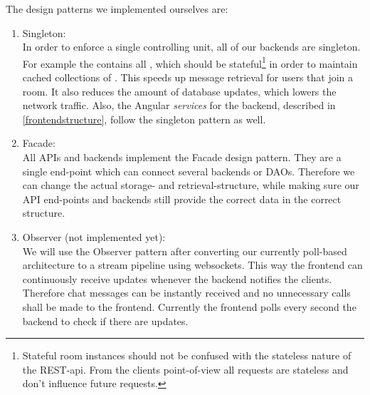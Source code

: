 The design patterns we implemented ourselves are:

\begin{enumerate}
\item Singleton:\\
In order to enforce a single controlling unit, all of our backends \cite{backend} are singleton.
For example the  contains all , which should be stateful\footnote{Stateful room instances should not be confused with the stateless nature of the REST-api. From the clients point-of-view all requests are stateless and don't influence future requests.} in order to maintain cached collections of .
This speeds up message retrieval for users that join a room.
It also reduces the amount of database updates, which lowers the network traffic.
Also, the Angular \textit{services} for the backend, described in \ref{frontendstructure}, follow the singleton pattern as well.

\item Facade:\\
All APIs and backends implement the Facade design pattern.
They are a single end-point which can connect several backends or DAOs.
Therefore we can change the actual storage- and retrieval-structure, while making sure our API end-points and backends still provide the correct data in the correct structure.

\item Observer (not implemented yet):\\
We will use the Observer pattern after converting our currently poll-based architecture to a stream pipeline using websockets.
This way the frontend can continuously receive updates whenever the backend notifies the clients.
Therefore chat messages can be instantly received and no unnecessary calls shall be made to the frontend.
Currently the frontend polls every second the backend to check if there are updates.
\end{enumerate}
